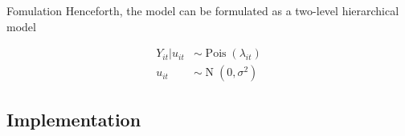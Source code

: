 \documentclass[aspectratio=169]{beamer}
\DeclareMathOperator{\N}{N}
\DeclareMathOperator{\Pois}{Pois}
\begin{document}
\begin{frame}{Fomulation}
\protect\hypertarget{fomulation}{}
Henceforth, the model can be formulated as a two-level hierarchical
model

\begin{subequations}
  \begin{alignat}{2}
    Y_{it}|u_{it} &\sim \Pois (\lambda_{it}) \label{eq:pois_ln0} \\ 
    u_{it} &\sim \N(0,\sigma^2) \label{eq:pois_ln1}
  \end{alignat}
\end{subequations}
\end{frame}

\hypertarget{implementation}{%
\subsection{Implementation}\label{implementation}}
\end{document}
